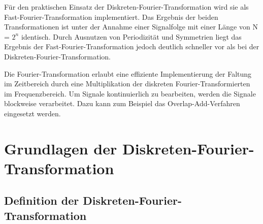 Für den praktischen Einsatz der Diskreten-Fourier-Transformation wird sie als Fast-Fourier-Transformation implementiert. Das Ergebnis der beiden Transformationen ist unter der Annahme einer Signalfolge mit einer Länge von N = \(2^{n}\) identisch. Durch Ausnutzen von Periodizität und Symmetrien liegt das Ergebnis der Fast-Fourier-Transformation jedoch deutlich schneller vor als bei der Diskreten-Fourier-Transformation.

Die Fourier-Transformation erlaubt eine effiziente Implementierung der Faltung im Zeitbereich durch eine Multiplikation der diskreten Fourier-Transformierten im Frequenzbereich. Um Signale kontinuierlich zu bearbeiten, werden die Signale blockweise verarbeitet. Dazu kann zum Beispiel das Overlap-Add-Verfahren eingesetzt werden.

\section{Grundlagen der Diskreten-Fourier-Transformation}\label{sec:10.1}

\subsection{Definition der Diskreten-Fourier-Transformation}\label{sec:10.1.1}

